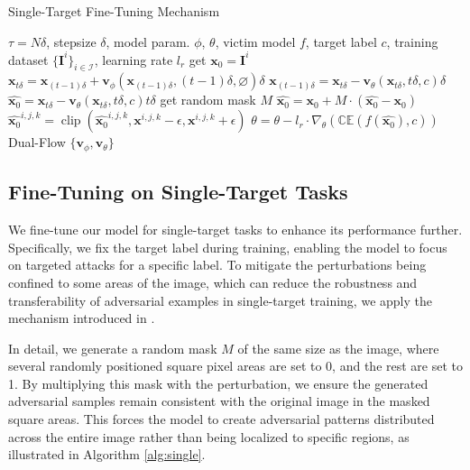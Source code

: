 \begin{algorithm}[]
   \caption{Single-Target Fine-Tuning Mechanism}
   \label{alg:single}
\begin{algorithmic}
    $\tau = N\delta$, stepsize $\delta$, model param. $\phi$, $\theta$, victim model $f$, target label $c$, training dataset $\{\mathbf{I}^i\}_{i\in \mathcal{I}}$, learning rate $l_r$
   \REPEAT
   \STATE get $\mathbf{x}_0 = \mathbf{I}^i$
   \STATE $\mathbf{x}_{t\delta} = \mathbf{x}_{(t-1)\delta} + \mathbf{v}_\phi(\mathbf{x}_{(t-1)\delta}, (t-1)\delta, \varnothing) \delta$
   \ENDFOR
   \STATE $\mathbf{x}_{(t-1)\delta} = \mathbf{x}_{t\delta} - \mathbf{v}_\theta(\mathbf{x}_{t\delta}, t\delta, c) \delta$
   \STATE $\widehat{\mathbf{x}_0} = \mathbf{x}_{t\delta} - \mathbf{v}_\theta(\mathbf{x}_{t\delta}, t\delta, c) t \delta$
   \STATE get random mask $M$
   \STATE $\widehat{\mathbf{x}_0} = \mathbf{x}_0 + M \cdot (\widehat{\mathbf{x}_0} - \mathbf{x}_0)$
   \STATE $\widehat{\mathbf{x}_0}^{i,j,k} = \operatorname{clip}\left( \widehat{\mathbf{x}_0}^{i,j,k}, \mathbf{x}^{i,j,k} - \epsilon, \mathbf{x}^{i,j,k} + \epsilon \right)$
   \STATE $\theta = \theta - l_r \cdot \nabla_\theta(\mathbb{CE}(f(\widehat{\mathbf{x}_0}), c))$
   \ENDFOR
   \ENDFOR
    Dual-Flow $\{\mathbf{v}_\phi,\mathbf{v}_\theta\}$
\end{algorithmic}
\end{algorithm}

\subsection{Fine-Tuning on Single-Target Tasks}
\label{appendix:single_finetune}
We fine-tune our model for single-target tasks to enhance its performance further. Specifically, we fix the target label during training, enabling the model to focus on targeted attacks for a specific label. To mitigate the perturbations being confined to some areas of the image, which can reduce the robustness and transferability of adversarial examples in single-target training, we apply the mechanism introduced in \cite{fang2025clip}.

In detail, we generate a random mask $M$ of the same size as the image, where several randomly positioned square pixel areas are set to 0, and the rest are set to 1. By multiplying this mask with the perturbation, we ensure the generated adversarial samples remain consistent with the original image in the masked square areas. This forces the model to create adversarial patterns distributed across the entire image rather than being localized to specific regions, as illustrated in Algorithm \ref{alg:single}.

